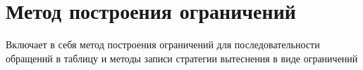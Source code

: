 \documentclass[14pt]{extreport}
\begin{document}
\section{Метод построения ограничений}\label{constraints_generation_section}
 Включает в себя метод построения ограничений для последовательности обращений в таблицу и методы записи стратегии вытеснения в виде ограничений






\pagebreak
\appendix



\pagebreak





\end{document}
